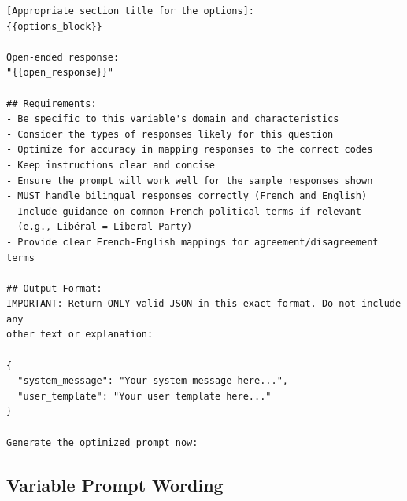 {\begin{verbatim}
[Appropriate section title for the options]:
{{options_block}}

Open-ended response:
"{{open_response}}"

## Requirements:
- Be specific to this variable's domain and characteristics
- Consider the types of responses likely for this question
- Optimize for accuracy in mapping responses to the correct codes
- Keep instructions clear and concise
- Ensure the prompt will work well for the sample responses shown
- MUST handle bilingual responses correctly (French and English)
- Include guidance on common French political terms if relevant 
  (e.g., Libéral = Liberal Party)
- Provide clear French-English mappings for agreement/disagreement terms

## Output Format:
IMPORTANT: Return ONLY valid JSON in this exact format. Do not include any 
other text or explanation:

{
  "system_message": "Your system message here...",
  "user_template": "Your user template here..."
}

Generate the optimized prompt now:
\end{verbatim}
}

\clearpage

\subsection{Variable Prompt Wording}
\label{appendix-variable-prompt}

